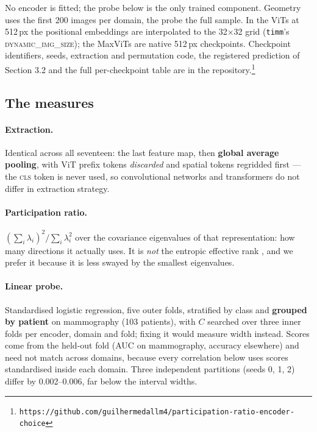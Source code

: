 \documentclass{esannV2}
\begin{document}
No encoder is fitted; the probe below is the only trained component. Geometry
uses the first 200 images per domain, the probe the full sample. In the ViTs at
512\,px the positional embeddings are interpolated to the 32$\times$32 grid
(\texttt{timm}'s \textsc{dynamic\_img\_size}); the MaxViTs are native
512\,px checkpoints. Checkpoint identifiers, seeds, extraction and permutation
code, the registered prediction of Section 3.2 and the full per-checkpoint
table are in the
repository.\footnote{\texttt{https://github.com/guilhermedallm4/participation-ratio-encoder-choice}}

\subsection{The measures}

\paragraph{Extraction.} Identical across all seventeen: the last feature map,
then \textbf{global average pooling}, with ViT prefix tokens \emph{discarded}
and spatial tokens regridded first --- the \textsc{cls} token is never used, so
convolutional networks and transformers do not differ in extraction strategy.

\paragraph{Participation ratio.} $(\sum_i \lambda_i)^2/\sum_i \lambda_i^2$ over
the covariance eigenvalues of that representation: how many directions it
actually uses. It is \emph{not} the entropic effective rank \cite{EffRank}, and
we prefer it because it is less swayed by the smallest eigenvalues.

\paragraph{Linear probe.} Standardised logistic regression, five outer folds,
stratified by class and \textbf{grouped by patient} on mammography (103
patients), with $C$ searched over three inner folds per encoder, domain and
fold; fixing it would measure width instead. Scores come from the held-out fold
(AUC on mammography, accuracy elsewhere) and need not match across domains,
because every correlation below uses scores standardised inside each domain. Three independent partitions (seeds 0, 1, 2)
differ by 0.002--0.006, far below the interval widths.
\end{document}

